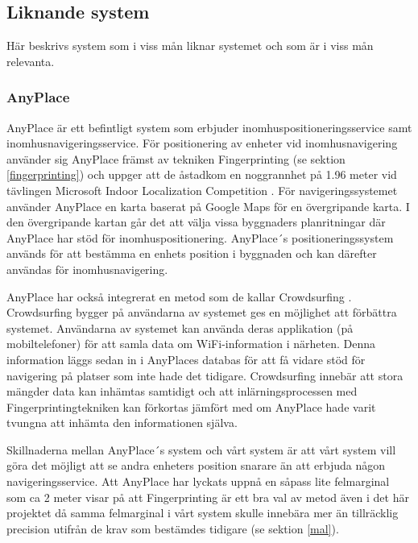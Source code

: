 \documentclass[swedish, a4paper,12pt]{article}
\begin{document}
\subsection{Liknande system}
Här beskrivs system som i viss mån liknar systemet och som är i viss mån relevanta.

\subsubsection{AnyPlace}
AnyPlace är ett befintligt system som erbjuder inomhuspositioneringsservice samt inomhusnavigeringsservice. För positionering av enheter vid inomhusnavigering använder sig AnyPlace främst av tekniken Fingerprinting (se sektion \ref{fingerprinting}) och uppger att de åstadkom en noggrannhet på 1.96 meter vid tävlingen Microsoft Indoor Localization Competition \cite{anyplace}
\cite{IPS_tavling}.
För navigeringssystemet använder AnyPlace en karta baserat på Google Maps för en övergripande karta. I den övergripande kartan går det att välja vissa byggnaders planritningar där AnyPlace har stöd för inomhuspositionering. AnyPlace´s positioneringssystem används för att bestämma en enhets position i byggnaden och kan därefter användas för inomhusnavigering.

AnyPlace har också integrerat en metod som de kallar Crowdsurfing \cite{anyplace}. Crowdsurfing bygger på användarna av systemet ges en möjlighet att förbättra systemet. Användarna av systemet kan använda deras applikation (på mobiltelefoner) för att samla data om WiFi-information i närheten. Denna information läggs sedan in i AnyPlaces databas för att få vidare stöd för navigering på platser som inte hade det tidigare. Crowdsurfing innebär att stora mängder data kan inhämtas samtidigt och att inlärningsprocessen med Fingerprintingtekniken kan förkortas jämfört med om AnyPlace hade varit tvungna att inhämta den informationen själva.

Skillnaderna mellan AnyPlace´s system och vårt system är att vårt system vill göra det möjligt att se andra enheters position snarare än att erbjuda någon navigeringsservice. Att AnyPlace har lyckats uppnå en såpass lite felmarginal som ca 2 meter visar på att Fingerprinting är ett bra val av metod även i det här projektet då samma felmarginal i vårt system skulle innebära mer än tillräcklig precision utifrån de krav som bestämdes tidigare (se sektion \ref{mal}).

\end{document}
